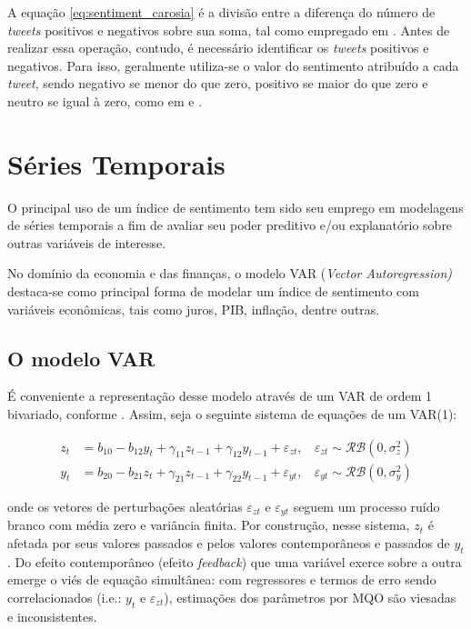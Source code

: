 A equação \ref{eq:sentiment_carosia} é a divisão entre a diferença do número de \textit{tweets} positivos e negativos sobre sua soma, tal como empregado em \textcite{carosia_analyzing_2020}. Antes de realizar essa operação, contudo, é necessário identificar os \textit{tweets} positivos e negativos. Para isso, geralmente utiliza-se o valor do sentimento atribuído a cada \textit{tweet}, sendo negativo se menor do que zero, positivo se maior do que zero e neutro se igual à zero, como em \textcite{mello_combining_2022} e \textcite{januario_sentiment_2022}.  

\clearpage
\section{Séries Temporais}
\label{metodologia_series_temporais}


O principal uso de um índice de sentimento tem sido seu emprego em modelagens de séries temporais a fim de avaliar seu poder preditivo e/ou explanatório sobre outras variáveis de interesse. 

No domínio da economia e das finanças, o modelo VAR (\textit{Vector Autoregression)} destaca-se como principal forma de modelar um índice de sentimento com variáveis econômicas, tais como juros, PIB, inflação, dentre outras. 


\subsection{O modelo VAR}


É conveniente a representação desse modelo através de um VAR de ordem 1 bivariado, conforme \textcite{enders_applied_2015}. Assim, seja o seguinte sistema de equações de um VAR(1):

\begin{align*}
z_t  &= b_{10} - b_{12} y_t + \gamma_{11} z_{t-1} + \gamma_{12} y_{t-1} + \varepsilon_{zt}, ~~~~\varepsilon_{zt} \sim \mathcal{RB}(0, \sigma^2_z) 
\\
y_t &= b_{20} - b_{21} z_t + \gamma_{21} z_{t-1} + \gamma_{22} y_{t-1} + \varepsilon_{yt}, ~~~~\varepsilon_{yt} \sim \mathcal{RB}(0, \sigma^2_y)
\end{align*}

onde os vetores de perturbações aleatórias \(\varepsilon_{zt}\) e \(\varepsilon_{yt}\) seguem um processo ruído branco com média zero e variância finita. Por construção, nesse sistema, \( z_t \) é afetada por seus valores passados e pelos valores contemporâneos e passados de  \( y_t \). Do efeito contemporâneo (efeito \textit{feedback}) que uma variável exerce sobre a outra emerge o viés de equação simultânea: com regressores e termos de erro sendo correlacionados (i.e.: \( y_t \) e  \(\varepsilon_{zt}\)), estimações dos parâmetros por MQO são viesadas e inconsistentes.


